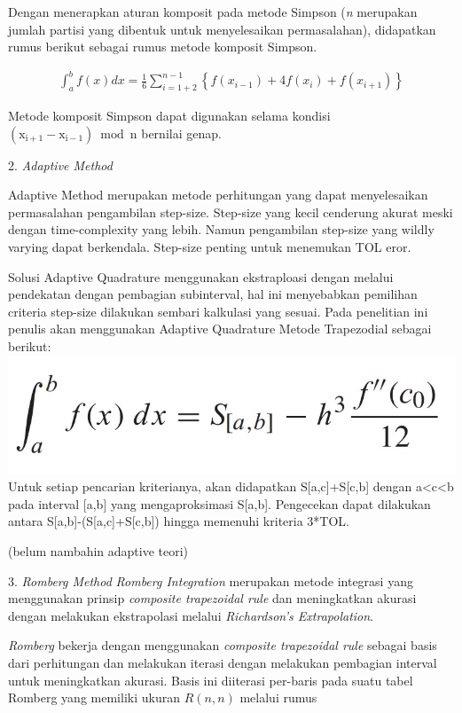 \documentclass[journal,12pt,onecolumn,a4paper]{IEEEtran}
\begin{document}
Dengan menerapkan aturan komposit pada metode Simpson (\emph{n} merupakan jumlah partisi yang dibentuk untuk menyelesaikan permasalahan), didapatkan rumus berikut sebagai rumus metode komposit Simpson.

\begin{equation*}
	\begin{split}
		\int_{a}^{b}f(x)dx=\frac{1}{6}\sum_{i=1+2}^{n-1}\left \{ f(x_{i-1})+4f(x_{i})+f(x_{i+1}) \right \}
	\end{split}
\end{equation*}

Metode komposit Simpson dapat digunakan selama kondisi \(\mathrm{(x_{i+1}-x_{i-1}) \bmod n}\) bernilai genap.

2. \emph{Adaptive Method}

Adaptive Method merupakan metode perhitungan yang dapat menyelesaikan permasalahan pengambilan step-size. Step-size yang kecil cenderung akurat meski dengan time-complexity yang lebih. Namun pengambilan step-size yang wildly varying dapat berkendala.  Step-size penting untuk menemukan TOL eror.

Solusi Adaptive Quadrature menggunakan ekstraploasi dengan melalui pendekatan dengan pembagian subinterval, hal ini menyebabkan pemilihan criteria step-size dilakukan sembari kalkulasi yang sesuai. Pada penelitian ini penulis akan menggunakan Adaptive Quadrature Metode Trapezodial sebagai berikut:
\includegraphics[scale=0.4, center]{adapt.jpg}
Untuk setiap pencarian kriterianya, akan didapatkan S[a,c]+S[c,b] dengan a<c<b pada interval [a,b] yang mengaproksimasi S[a,b]. Pengecekan dapat dilakukan antara S[a,b]-(S[a,c]+S[c,b]) hingga memenuhi kriteria 3*TOL.

(belum nambahin adaptive teori)

3. \emph{Romberg Method}
\emph{Romberg Integration} merupakan metode integrasi yang menggunakan prinsip \emph{composite trapezoidal rule} dan meningkatkan akurasi dengan melakukan ekstrapolasi melalui \emph{Richardson's Extrapolation}.

\emph{Romberg} bekerja dengan menggunakan \emph{composite trapezoidal rule} sebagai basis dari perhitungan dan melakukan iterasi dengan melakukan pembagian interval untuk meningkatkan akurasi. Basis ini diiterasi per-baris pada suatu tabel Romberg yang memiliki ukuran \(R(n,n)\) melalui rumus
\end{document}
